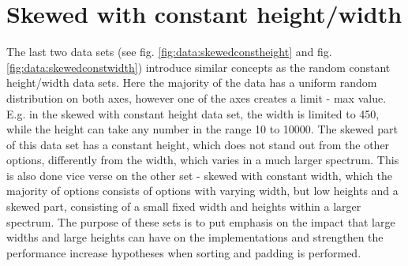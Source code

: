 \section{Skewed with constant height/width}
The last two data sets (see fig. \ref{fig:data:skewedconstheight} and fig. \ref{fig:data:skewedconstwidth}) introduce similar concepts as the random constant height/width data sets. Here the majority of the data has a uniform random distribution on both axes, however one of the axes creates a limit - max value. E.g. in the skewed with constant height data set, the width is limited to 450, while the height can take any number in the range 10 to 10000. The skewed part of this data set has a constant height, which does not stand out from the other options, differently from the width, which varies in a much larger spectrum. This is also done vice verse on the other set - skewed with constant width, which the majority of options consists of options with varying width, but low heights and a skewed part, consisting of a small fixed width and heights within a larger spectrum. The purpose of these sets is to put emphasis on the impact that large widths and large heights can have on the implementations and strengthen the performance increase hypotheses when sorting and padding is performed.

